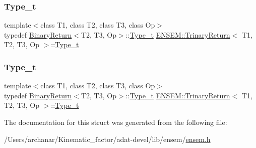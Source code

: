 \mbox{\label{structENSEM_1_1TrinaryReturn_a3b5bb49c40f17dcf3bdb007c9e591b0e}} 
\subsubsection{\texorpdfstring{Type\_t}{Type\_t}\hspace{0.1cm}{\footnotesize\ttfamily [2/3]}}
{\footnotesize\ttfamily template$<$class T1, class T2, class T3, class Op$>$ \\
typedef \mbox{\hyperlink{structENSEM_1_1BinaryReturn}{Binary\+Return}}$<$T2, T3, Op$>$\+::\mbox{\hyperlink{structENSEM_1_1TrinaryReturn_a3b5bb49c40f17dcf3bdb007c9e591b0e}{Type\+\_\+t}} \mbox{\hyperlink{structENSEM_1_1TrinaryReturn}{E\+N\+S\+E\+M\+::\+Trinary\+Return}}$<$ T1, T2, T3, Op $>$\+::\mbox{\hyperlink{structENSEM_1_1TrinaryReturn_a3b5bb49c40f17dcf3bdb007c9e591b0e}{Type\+\_\+t}}}

\mbox{\label{structENSEM_1_1TrinaryReturn_a3b5bb49c40f17dcf3bdb007c9e591b0e}} 
\subsubsection{\texorpdfstring{Type\_t}{Type\_t}\hspace{0.1cm}{\footnotesize\ttfamily [3/3]}}
{\footnotesize\ttfamily template$<$class T1, class T2, class T3, class Op$>$ \\
typedef \mbox{\hyperlink{structENSEM_1_1BinaryReturn}{Binary\+Return}}$<$T2, T3, Op$>$\+::\mbox{\hyperlink{structENSEM_1_1TrinaryReturn_a3b5bb49c40f17dcf3bdb007c9e591b0e}{Type\+\_\+t}} \mbox{\hyperlink{structENSEM_1_1TrinaryReturn}{E\+N\+S\+E\+M\+::\+Trinary\+Return}}$<$ T1, T2, T3, Op $>$\+::\mbox{\hyperlink{structENSEM_1_1TrinaryReturn_a3b5bb49c40f17dcf3bdb007c9e591b0e}{Type\+\_\+t}}}



The documentation for this struct was generated from the following file\+:\begin{DoxyCompactItemize}
\item 
/\+Users/archanar/\+Kinematic\+\_\+factor/adat-\/devel/lib/ensem/\mbox{\hyperlink{adat-devel_2lib_2ensem_2ensem_8h}{ensem.\+h}}\end{DoxyCompactItemize}
